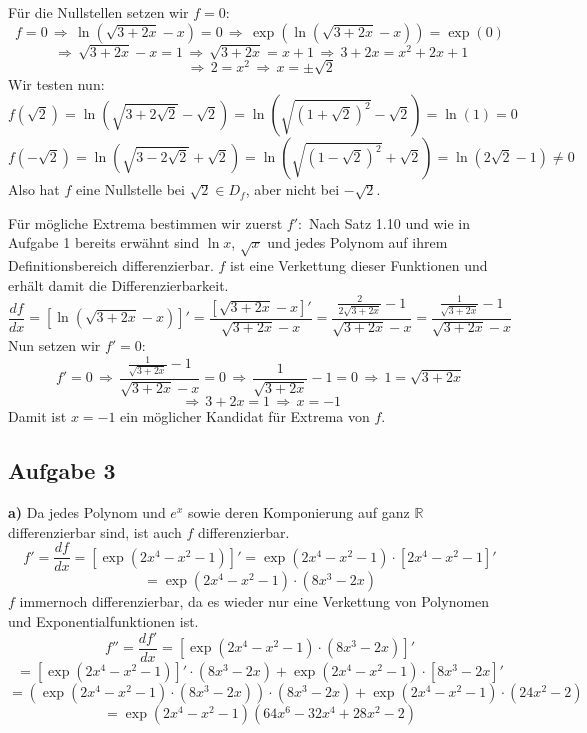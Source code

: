 \documentclass[a4paper,graphics,11pt]{article}
\newcommand{\aufgabe}[1]{\subsection*{Aufgabe #1}}
\begin{document}
Für die Nullstellen setzen wir $f = 0$:
$$
    f = 0 \,\Longrightarrow\, \ln\left(\sqrt{3+2x}-x\right) = 0
    \,\Longrightarrow\, \exp\left(\ln\left(\sqrt{3+2x}-x\right)\right) = \exp(0)
$$$$
    \,\Longrightarrow\, \sqrt{3+2x} -x = 1 \,\Longrightarrow\, \sqrt{3+2x} = x+1
    \,\Longrightarrow\, 3+2x = x^2+2x+1
$$$$
    \,\Longrightarrow\, 2 = x^2 \,\Longrightarrow\, x = \pm\sqrt{2}
$$
Wir testen nun:
$$
    f(\sqrt{2}) = \ln\left(\sqrt{3+2\sqrt{2}}-\sqrt{2}\right)
    = \ln\left(\sqrt{(1+\sqrt{2})^2} -\sqrt{2}\right)
    = \ln(1) = 0
$$$$
    f(-\sqrt{2}) = \ln\left(\sqrt{3-2\sqrt{2}}+\sqrt{2}\right)
    = \ln\left(\sqrt{(1-\sqrt{2})^2} +\sqrt{2}\right)
    = \ln(2\sqrt{2}-1) \neq 0
$$
Also hat $f$ eine Nullstelle bei $\sqrt{2} \in D_f$, aber nicht bei $-\sqrt{2}$.

Für mögliche Extrema bestimmen wir zuerst $f'\colon$
Nach Satz 1.10 und wie in Aufgabe 1 bereits erwähnt sind $\ln x$, $\sqrt{x}$ und jedes Polynom auf ihrem
Definitionsbereich differenzierbar. $f$ ist eine Verkettung dieser Funktionen und erhält damit die Differenzierbarkeit.
$$
    \frac{df}{dx} = \left[\ln\left(\sqrt{3+2x}-x\right)\right]'
    = \frac{\left[\sqrt{3+2x}-x\right]'}{\sqrt{3+2x} -x}
    = \frac{\frac{2}{2\sqrt{3+2x}}-1}{\sqrt{3+2x} -x}
    = \frac{\frac{1}{\sqrt{3+2x}}-1}{\sqrt{3+2x}-x}
$$
Nun setzen wir $f' = 0\colon$
$$
    f'=0 \,\Longrightarrow\, \frac{\frac{1}{\sqrt{3+2x}} -1}{\sqrt{3+2x} -x} = 0
    \,\Longrightarrow\, \frac{1}{\sqrt{3+2x}} -1 = 0
    \,\Longrightarrow\, 1 = \sqrt{3+2x}
$$$$
    \,\Longrightarrow\, 3+2x = 1
    \,\Longrightarrow\, x = -1
$$
Damit ist $x = -1$ ein möglicher Kandidat für Extrema von $f$.

\newpage

\aufgabe{3}

\textbf{a)}
Da jedes Polynom und $e^x$ sowie deren Komponierung auf ganz $\mathbb{R}$ differenzierbar sind, ist auch $f$
differenzierbar.
$$
    f' = \frac{df}{dx} = \left[\exp(2x^4-x^2-1)\right]'
    = \exp(2x^4-x^2-1)\cdot \left[2x^4-x^2-1\right]'
$$$$
    = \exp(2x^4-x^2-1) \cdot (8x^3-2x)
$$
$f$ immernoch differenzierbar, da es wieder nur eine Verkettung von Polynomen und Exponentialfunktionen ist.
$$
    f'' = \frac{df'}{dx} = \left[\exp(2x^4-x^2-1)\cdot (8x^3-2x)\right]'
$$$$
    = [\exp(2x^4-x^2-1)]'\cdot(8x^3-2x) + \exp(2x^4-x^2-1)\cdot[8x^3-2x]'
$$$$
    = \left(\exp(2x^4-x^2-1) \cdot (8x^3-2x)\right) \cdot(8x^3-2x) + \exp(2x^4-x^2-1)\cdot(24x^2-2)
$$$$
    = \exp(2x^4-x^2-1)(64x^6-32x^4+28x^2-2)
$$
\end{document}
